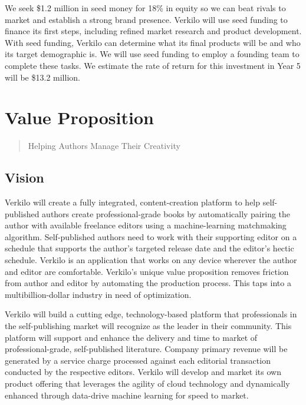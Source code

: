 \documentclass[10pt,openany]{book}
\begin{document}
We seek \$1.2 million in seed money for 18\% in equity so we can beat
rivals to market and establish a strong brand presence. Verkilo will use
seed funding to finance its first steps, including refined market
research and product development. With seed funding, Verkilo can
determine what its final products will be and who its target demographic
is. We will use seed funding to employ a founding team to complete these
tasks. We estimate the rate of return for this investment in Year 5 will
be \$13.2 million.

\hypertarget{value-proposition}{%
\chapter{Value Proposition}\label{value-proposition}}

\begin{quote}
Helping Authors Manage Their Creativity
\end{quote}

\hypertarget{vision}{%
\section{Vision}\label{vision}}

Verkilo will create a fully integrated, content-creation platform to
help self-published authors create professional-grade books by
automatically pairing the author with available freelance editors using
a machine-learning matchmaking algorithm. Self-published authors need to
work with their supporting editor on a schedule that supports the
author's targeted release date and the editor's hectic schedule. Verkilo
is an application that works on any device wherever the author and
editor are comfortable. Verkilo's unique value proposition removes
friction from author and editor by automating the production process.
This taps into a multibillion-dollar industry in need of optimization.

Verkilo will build a cutting edge, technology-based platform that
professionals in the self-publishing market will recognize as the leader
in their community. This platform will support and enhance the delivery
and time to market of professional-grade, self-published literature.
Company primary revenue will be generated by a service charge processed
against each editorial transaction conducted by the respective editors.
Verkilo will develop and market its own product offering that leverages
the agility of cloud technology and dynamically enhanced through
data-drive machine learning for speed to market.
\end{document}
